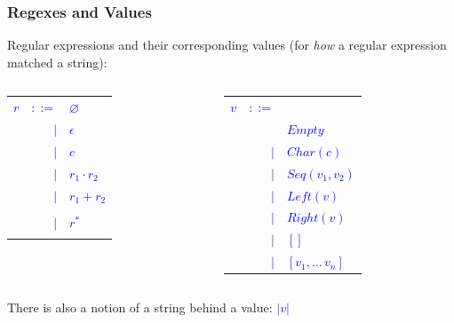 \documentclass[dvipsnames,14pt,t]{beamer}
\newcommand{\bl}[1]{\textcolor{blue}{#1}}
\begin{document}
\begin{frame}[c]
\frametitle{Regexes and Values}

Regular expressions and their corresponding values
(for \emph{how} a regular expression matched a string):

\begin{center}
\begin{columns}
\begin{column}{3cm}
\begin{tabular}{@{}rrl@{}}
  \bl{$r$} & \bl{$::=$}  & \bl{$\varnothing$}\\
           & \bl{$\mid$} & \bl{$\epsilon$}   \\
           & \bl{$\mid$} & \bl{$c$}          \\
           & \bl{$\mid$} & \bl{$r_1 \cdot r_2$}\\
           & \bl{$\mid$} & \bl{$r_1 + r_2$}   \\
  \\
           & \bl{$\mid$} & \bl{$r^*$}         \\
  \\
  \end{tabular}
\end{column}
\begin{column}{3cm}
\begin{tabular}{@{\hspace{-7mm}}rrl@{}}
  \bl{$v$} & \bl{$::=$}  & \\
           &             & \bl{$Empty$}   \\
           & \bl{$\mid$} & \bl{$Char(c)$}          \\
           & \bl{$\mid$} & \bl{$Seq(v_1,v_2)$}\\
           & \bl{$\mid$} & \bl{$Left(v)$}   \\
           & \bl{$\mid$} & \bl{$Right(v)$}  \\
           & \bl{$\mid$} & \bl{$[]$}      \\
           & \bl{$\mid$} & \bl{$[v_1,\ldots\,v_n]$} \\
  \end{tabular}
\end{column}
\end{columns}
\end{center}\pause

There is also a notion of a string behind a value: \bl{$|v|$}

\end{frame}
\end{document}
